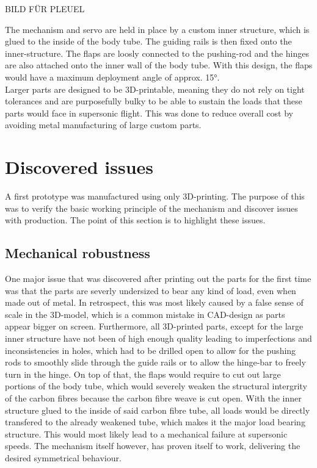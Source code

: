 \documentclass[fontsize=11pt,%
twoside,%
BCOR          = 8mm, %
DIV           = 11,  %
titlepage     = off,%
index=totoc,%
xcolor        = pdftex,%
dvipsnames,%
bibliography  = totoc,%
bibliography = numbered, %
listof        = notnumbered]{scrreprt}
\begin{document}
BILD FÜR PLEUEL

The mechanism and servo are held in place by a custom inner structure, which is glued to the inside of the body tube. The guiding rails is then fixed onto the inner-structure. The flaps are loosly connected to the pushing-rod and the hinges are also attached onto the inner wall of the body tube. With this design, the flaps would have a maximum deployment angle of approx. 15°.\\
Larger parts are designed to be 3D-printable, meaning they do not rely on tight tolerances and are purposefully bulky to be able to sustain the loads that these parts would face in supersonic flight. This was done to reduce overall cost by avoiding metal manufacturing of large custom parts.

\section{Discovered issues}
A first prototype was manufactured using only 3D-printing. The purpose of this was to verify the basic working principle of the mechanism and discover issues with production. The point of this section is to  highlight these issues.

\subsection{Mechanical robustness}
One major issue that was discovered after printing out the parts for the first time was that the parts are severly undersized to bear any kind of load, even when made out of metal. In retrospect, this was most likely caused by a false sense of scale in the 3D-model, which is a common mistake in CAD-design as parts appear bigger on screen. Furthermore, all 3D-printed parts, except for the large inner structure have not been of high enough quality leading to imperfections and inconsistencies in holes, which had to be drilled open to allow for the pushing rods to smoothly slide through the guide rails or to allow the hinge-bar to freely turn in the hinge.
On top of that, the flaps would require to cut out large portions of the body tube, which would severely weaken the structural intergrity of the carbon fibres because the carbon fibre weave is cut open. With the inner structure glued to the inside of said carbon fibre tube, all loads would be directly transfered to the already weakened tube, which makes it the major load bearing structure. This would most likely lead to a mechanical failure at supersonic speeds.
The mechanism itself however, has proven itself to work, delivering the desired symmetrical behaviour.
\end{document}

